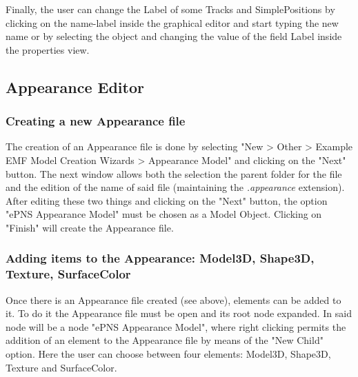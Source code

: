 Finally, the user can change the Label of some Tracks and SimplePositions by clicking on the name-label inside the graphical editor and start typing the new name or by selecting the object and changing the value of the field Label inside the properties view.

\subsection{Appearance Editor}
\label{sec:userguide:appearance}

\subsubsection{Creating a new Appearance file}
\label{sec:userguide:appearance:create}
The creation of an Appearance file is done by selecting "New > Other > Example EMF Model Creation Wizards > Appearance Model" and clicking on the "Next" button. The next window allows both the selection the parent folder for the file and the edition of the name of said file (maintaining the \textit{.appearance} extension). After editing these two things and clicking on the "Next" button, the option "ePNS Appearance Model" must be chosen as a Model Object. Clicking on "Finish" will create the Appearance file.

\subsubsection{Adding items to the Appearance: Model3D, Shape3D, Texture, SurfaceColor}
   
\label{sec:userguide:appearance:add}
Once there is an Appearance file created (see above), elements can be added to it. To do it the Appearance file must be open and its root node expanded. In said node will be a node "ePNS Appearance Model", where right clicking permits the addition of an element to the Appearance file by means of the "New Child" option. Here the user can choose between four elements: Model3D, Shape3D, Texture and SurfaceColor.
